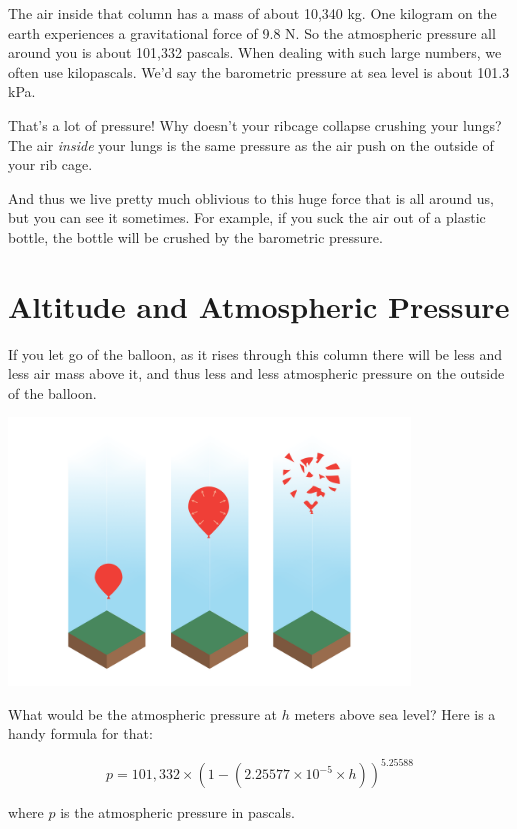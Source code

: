 The air inside that column has a mass of about 10,340 kg.  One kilogram on the earth experiences a gravitational force of 9.8 N.   
So the atmospheric pressure all around you is about 101,332 pascals.  
When dealing with such large numbers, we often use kilopascals.  
We'd say the barometric pressure at sea level is about 101.3 kPa.

That's a lot of pressure!  Why doesn't your ribcage collapse crushing your lungs?  The air \emph{inside} your lungs is the same 
pressure as the air push on the outside of your rib cage.  

And thus we live pretty much oblivious to this huge force that is all around us, but you can see it sometimes.  
For example, if you suck the air out of a plastic bottle,   the bottle will be crushed by the barometric pressure.

\section{Altitude and Atmospheric Pressure}

If you let go of the balloon, as it rises through this column there will be less and less air mass above it, and thus less and less atmospheric pressure on the outside of the balloon. 

\includegraphics[width=0.8\textwidth]{balloonColumn.png}

What would be the atmospheric pressure at $h$ meters above sea level?  Here is a handy formula for that:

$$p = 101,332 \times \left(1 - \left( 2.25577 \times 10^{-5} \times h\right) \right)^{5.25588}$$

where $p$ is the atmospheric pressure in pascals.

